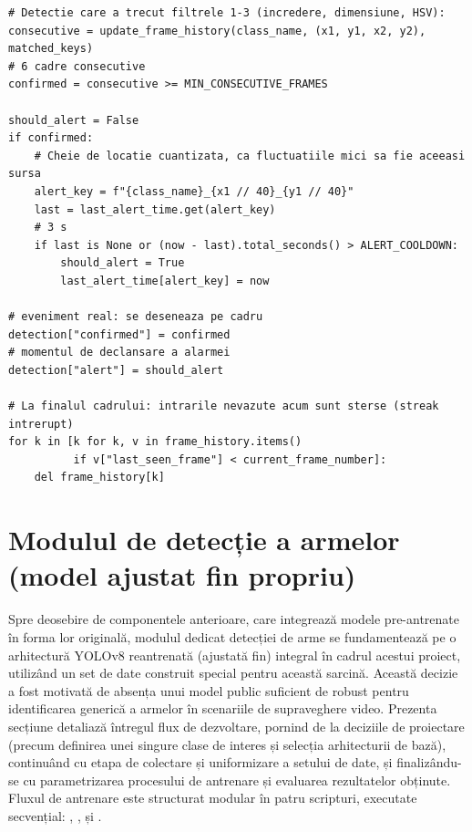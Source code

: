 \documentclass[../../main.tex]{subfiles}
\begin{document}
\begin{listing}[H]
\begin{verbatim}
# Detectie care a trecut filtrele 1-3 (incredere, dimensiune, HSV):
consecutive = update_frame_history(class_name, (x1, y1, x2, y2), matched_keys)
# 6 cadre consecutive
confirmed = consecutive >= MIN_CONSECUTIVE_FRAMES

should_alert = False
if confirmed:
    # Cheie de locatie cuantizata, ca fluctuatiile mici sa fie aceeasi sursa
    alert_key = f"{class_name}_{x1 // 40}_{y1 // 40}"
    last = last_alert_time.get(alert_key)
    # 3 s
    if last is None or (now - last).total_seconds() > ALERT_COOLDOWN:
        should_alert = True
        last_alert_time[alert_key] = now

# eveniment real: se deseneaza pe cadru
detection["confirmed"] = confirmed
# momentul de declansare a alarmei
detection["alert"] = should_alert

# La finalul cadrului: intrarile nevazute acum sunt sterse (streak intrerupt)
for k in [k for k, v in frame_history.items()
          if v["last_seen_frame"] < current_frame_number]:
    del frame_history[k]
\end{verbatim}
\caption{Derivarea indicatorilor \texttt{confirmed} și \texttt{alert} (\texttt{process\_frame} din \texttt{fire\_detection\_system.py}).}
\label{lst:fire_confirm}
\end{listing}

\section{Modulul de detecție a armelor (model ajustat fin propriu)}
\label{sec:modul_arme}

Spre deosebire de componentele anterioare, care integrează modele pre-antrenate în forma lor originală, modulul dedicat detecției de arme se fundamentează pe o arhitectură YOLOv8 reantrenată (ajustată fin) integral în cadrul acestui proiect, utilizând un set de date construit special pentru această sarcină. Această decizie a fost motivată de absența unui model public suficient de robust pentru identificarea generică a armelor în scenariile de supraveghere video. Prezenta secțiune detaliază întregul flux de dezvoltare, pornind de la deciziile de proiectare (precum definirea unei singure clase de interes și selecția arhitecturii de bază), continuând cu etapa de colectare și uniformizare a setului de date, și finalizându-se cu parametrizarea procesului de antrenare și evaluarea rezultatelor obținute. Fluxul de antrenare este structurat modular în patru scripturi, executate secvențial: , ,  și .
\end{document}
